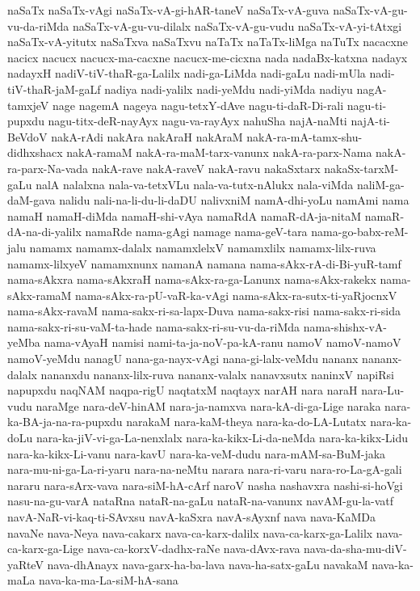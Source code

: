 {naSaTx
naSaTx-vAgi
naSaTx-vA-gi-hAR-taneV
naSaTx-vA-guva
naSaTx-vA-gu-vu-da-riMda
naSaTx-vA-gu-vu-dilalx
naSaTx-vA-gu-vudu
naSaTx-vA-yi-tAtxgi
naSaTx-vA-yitutx
naSaTxva
naSaTxvu
naTaTx
naTaTx-liMga
naTuTx
nacacxne
nacicx
nacucx
nacucx-ma-cacxne
nacucx-me-cicxna
nada
nadaBx-katxna
nadayx
nadayxH
nadiV-tiV-thaR-ga-Lalilx
nadi-ga-LiMda
nadi-gaLu
nadi-mUla
nadi-tiV-thaR-jaM-gaLf
nadiya
nadi-yalilx
nadi-yeMdu
nadi-yiMda
nadiyu
nagA-tamxjeV
nage
nagemA
nageya
nagu-tetxY-dAve
nagu-ti-daR-Di-rali
nagu-ti-pupxdu
nagu-titx-deR-nayAyx
nagu-va-rayAyx
nahuSha
najA-naMti
najA-ti-BeVdoV
nakA-rAdi
nakAra
nakAraH
nakAraM
nakA-ra-mA-tamx-shu-didhxshacx
nakA-ramaM
nakA-ra-maM-tarx-vanunx
nakA-ra-parx-Nama
nakA-ra-parx-Na-vada
nakA-rave
nakA-raveV
nakA-ravu
nakaSxtarx
nakaSx-tarxM-gaLu
nalA
nalalxna
nala-va-tetxVLu
nala-va-tutx-nAlukx
nala-viMda
naliM-ga-daM-gava
nalidu
nali-na-li-du-li-daDU
nalivxniM
namA-dhi-yoLu
namAmi
nama
namaH
namaH-diMda
namaH-shi-vAya
namaRdA
namaR-dA-ja-nitaM
namaR-dA-na-di-yalilx
namaRde
nama-gAgi
namage
nama-geV-tara
nama-go-babx-reM-jalu
namamx
namamx-dalalx
namamxlelxV
namamxlilx
namamx-lilx-ruva
namamx-lilxyeV
namamxnunx
namanA
namana
nama-sAkx-rA-di-Bi-yuR-tamf
nama-sAkxra
nama-sAkxraH
nama-sAkx-ra-ga-Lanunx
nama-sAkx-rakekx
nama-sAkx-ramaM
nama-sAkx-ra-pU-vaR-ka-vAgi
nama-sAkx-ra-sutx-ti-yaRjocnxV
nama-sAkx-ravaM
nama-sakx-ri-sa-lapx-Duva
nama-sakx-risi
nama-sakx-ri-sida
nama-sakx-ri-su-vaM-ta-hade
nama-sakx-ri-su-vu-da-riMda
nama-shishx-vA-yeMba
nama-vAyaH
namisi
nami-ta-ja-noV-pa-kA-ranu
namoV
namoV-namoV
namoV-yeMdu
nanagU
nana-ga-nayx-vAgi
nana-gi-lalx-veMdu
nananx
nananx-dalalx
nananxdu
nananx-lilx-ruva
nananx-valalx
nanavxsutx
naninxV
napiRsi
napupxdu
naqNAM
naqpa-rigU
naqtatxM
naqtayx
narAH
nara
naraH
nara-Lu-vudu
naraMge
nara-deV-hinAM
nara-ja-namxva
nara-kA-di-ga-Lige
naraka
nara-ka-BA-ja-na-ra-pupxdu
narakaM
nara-kaM-theya
nara-ka-do-LA-Lutatx
nara-ka-doLu
nara-ka-jiV-vi-ga-La-nenxlalx
nara-ka-kikx-Li-da-neMda
nara-ka-kikx-Lidu
nara-ka-kikx-Li-vanu
nara-kavU
nara-ka-veM-dudu
nara-mAM-sa-BuM-jaka
nara-mu-ni-ga-La-ri-yaru
nara-na-neMtu
narara
nara-ri-varu
nara-ro-La-gA-gali
nararu
nara-sArx-vava
nara-siM-hA-cArf
naroV
nasha
nashavxra
nashi-si-hoVgi
nasu-na-gu-varA
nataRna
nataR-na-gaLu
nataR-na-vanunx
navAM-gu-la-vatf
navA-NaR-vi-kaq-ti-SAvxsu
navA-kaSxra
navA-sAyxnf
nava
nava-KaMDa
navaNe
nava-Neya
nava-cakarx
nava-ca-karx-dalilx
nava-ca-karx-ga-Lalilx
nava-ca-karx-ga-Lige
nava-ca-korxV-dadhx-raNe
nava-dAvx-rava
nava-da-sha-mu-diV-yaRteV
nava-dhAnayx
nava-garx-ha-ba-lava
nava-ha-satx-gaLu
navakaM
nava-ka-maLa
nava-ka-ma-La-siM-hA-sana
}
